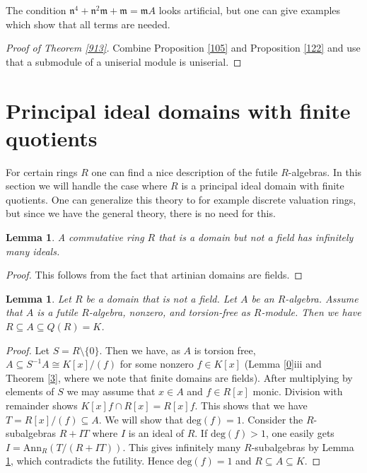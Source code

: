 \documentclass{amsart}
\theoremstyle{plain}
\newtheorem{lemma}[theorem]{Lemma}
\theoremstyle{definition}
\begin{document}
 The condition $\mathfrak{n}^4+\mathfrak{n}^2{\mathfrak{m}}+{\mathfrak{m}}={\mathfrak{m}} A$ looks artificial, but one can give examples which show that all terms are needed.

\begin{proof}[Proof of Theorem \ref{913}]
Combine Proposition \ref{105} and Proposition \ref{122} and use that a submodule of a uniserial module is uniserial.
\end{proof}

\section{Principal ideal domains with finite quotients}

For certain rings $R$ one can find a nice description of the futile $R$-algebras. In this section we will handle the case where $R$ is a principal ideal domain with finite quotients. One can generalize this theory 
to for example discrete valuation rings, but since we have the general theory, there is no need for this. 

\begin{lemma} \label{16}
 A commutative ring $R$ that is a domain but not a field has infinitely many ideals. 
\end{lemma}
\begin{proof}
This follows from the fact that artinian domains are fields.
\end{proof}

\begin{lemma} \label{18}
 Let $R$ be a domain that is not a field. Let $A$ be an $R$-algebra. Assume that $A$ is a futile $R$-algebra, nonzero, and torsion-free as $R$-module.
Then we have
$R \subseteq A \subseteq Q(R)=K$.  
\end{lemma}
\begin{proof}
 Let $S=R \setminus\{0\}$. Then we have, as $A$ is torsion free, $A \subseteq S^{-1}A \cong K[x]/(f)$ for some nonzero $f \in K[x]$ (Lemma
\ref{0}iii and Theorem \ref{3},
where we note that finite domains are fields). After multiplying by elements of $S$ we may assume that $x \in A$ and $f \in R[x]$ monic. 
Division with remainder shows $K[x]f \cap R[x]=R[x]f$. This shows that we have $T=R[x]/(f) \subseteq A$. We will show that
$\mathrm{deg}(f)=1$. Consider the $R$-subalgebras $R+IT$ where $I$ is an ideal of $R$. If $\mathrm{deg}(f)>1$, one easily gets
$I=\mathrm{Ann}_R(T/(R+IT))$. This gives infinitely many $R$-subalgebras by Lemma \ref{16}, which contradicts the futility. Hence
$\mathrm{deg}(f)=1$ and $R \subseteq A \subseteq K$.
\end{proof}
\end{document}
